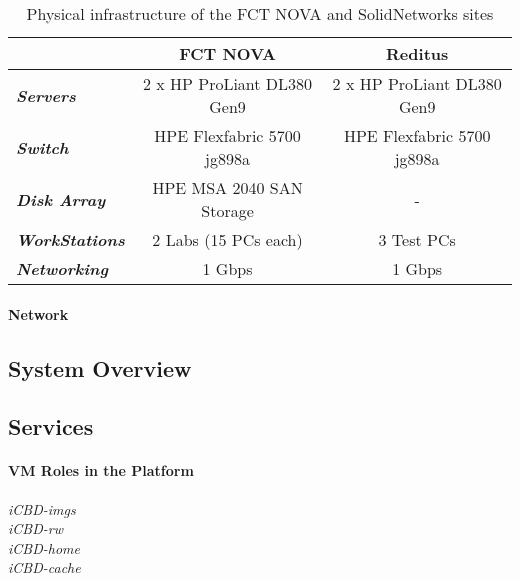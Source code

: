 \begin{table}[htpb]
\centering
\begin{tabular}{lcc}
\hline
                               & \textbf{FCT NOVA}          & \textbf{Reditus}           \\ \hline
\textit{\textbf{Servers}}      & 2 x HP ProLiant DL380 Gen9 & 2 x HP ProLiant DL380 Gen9 \\
\textit{\textbf{Switch}}       & HPE Flexfabric 5700 jg898a & HPE Flexfabric 5700 jg898a \\
\textit{\textbf{Disk Array}}   & HPE MSA 2040 SAN Storage   & -                          \\
\textit{\textbf{WorkStations}} & 2 Labs (15 PCs each)       & 3 Test PCs                 \\
\textit{\textbf{Networking}}   & 1 Gbps                     & 1 Gbps                     \\ \hline
\end{tabular}
\caption{Physical infrastructure of the FCT NOVA and SolidNetworks sites}
\end{table}

\paragraph{Network}
\label{par:infra_network}


\subsection{System Overview}
\label{sub:system_overview}

\subsection{Services}
\label{sub:cache_services}

\paragraph{VM Roles in the Platform}
\label{par:vm_roles}

\begin{description}
	\item [\textit{iCBD-imgs}]
	\item [\textit{iCBD-rw}]
	\item [\textit{iCBD-home}]
	\item [\textit{iCBD-cache}]
\end{description}


